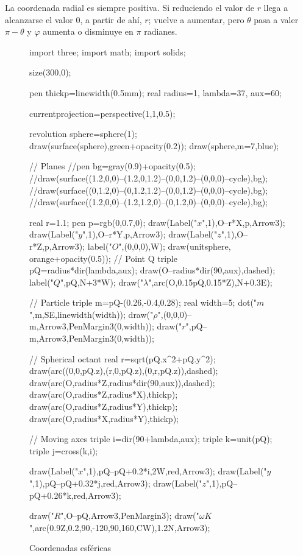 La coordenada radial es siempre positiva. Si reduciendo el valor de $r$ llega a alcanzarse el valor 0, a partir de ahí, $r$; vuelve a aumentar, pero $\theta$  pasa a valer $\pi-\theta$  y $\varphi$  aumenta o disminuye en $\pi$ radianes.

\begin{figure}[!ht]
	\begin{asy}
import three;
import math;
import solids;


size(300,0);

pen thickp=linewidth(0.5mm);
real radius=1, lambda=37, aux=60;

currentprojection=perspective(1,1,0.5);


revolution sphere=sphere(1);
draw(surface(sphere),green+opacity(0.2));
draw(sphere,m=7,blue);

// Planes
//pen bg=gray(0.9)+opacity(0.5);
//draw(surface((1.2,0,0)--(1.2,0,1.2)--(0,0,1.2)--(0,0,0)--cycle),bg);
//draw(surface((0,1.2,0)--(0,1.2,1.2)--(0,0,1.2)--(0,0,0)--cycle),bg);
//draw(surface((1.2,0,0)--(1.2,1.2,0)--(0,1.2,0)--(0,0,0)--cycle),bg);

real r=1.1;
pen p=rgb(0,0.7,0);
draw(Label("$x$",1),O--r*X,p,Arrow3);
draw(Label("$y$",1),O--r*Y,p,Arrow3);
draw(Label("$z$",1),O--r*Z,p,Arrow3);
label("$O$",(0,0,0),W);
draw(unitsphere, orange+opacity(0.5));
// Point Q
triple pQ=radius*dir(lambda,aux);
draw(O--radius*dir(90,aux),dashed);
label("$ Q$",pQ,N+3*W);
draw("$\lambda$",arc(O,0.15pQ,0.15*Z),N+0.3E);


// Particle
triple m=pQ-(0.26,-0.4,0.28);
real width=5;
dot("$m$",m,SE,linewidth(width));
draw("${\rho}$",(0,0,0)--m,Arrow3,PenMargin3(0,width));
draw("${r}$",pQ--m,Arrow3,PenMargin3(0,width));

// Spherical octant
real r=sqrt(pQ.x^2+pQ.y^2);
draw(arc((0,0,pQ.z),(r,0,pQ.z),(0,r,pQ.z)),dashed);
draw(arc(O,radius*Z,radius*dir(90,aux)),dashed);
draw(arc(O,radius*Z,radius*X),thickp);
draw(arc(O,radius*Z,radius*Y),thickp);
draw(arc(O,radius*X,radius*Y),thickp);

// Moving axes
triple i=dir(90+lambda,aux);
triple k=unit(pQ);
triple j=cross(k,i);

draw(Label("$x$",1),pQ--pQ+0.2*i,2W,red,Arrow3);
draw(Label("$y$",1),pQ--pQ+0.32*j,red,Arrow3);
draw(Label("$z$",1),pQ--pQ+0.26*k,red,Arrow3);

draw("${R}$",O--pQ,Arrow3,PenMargin3);
draw("$\omega{K}$",arc(0.9Z,0.2,90,-120,90,160,CW),1.2N,Arrow3);
	\end{asy}
	\caption{Coordenadas esféricas}
\end{figure}




